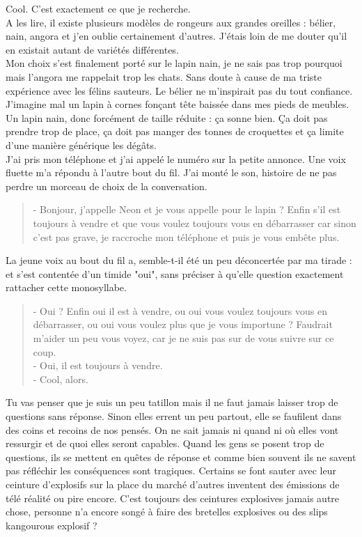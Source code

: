 Cool. C'est exactement ce que je recherche.\\

A les lire, il existe plusieurs modèles de rongeurs aux grandes oreilles : bélier, nain, angora et j'en oublie certainement d'autres. J'étais loin de me douter qu'il en existait autant de variétés différentes.\\
Mon choix s'est finalement porté sur le lapin nain, je ne sais pas trop pourquoi mais l'angora me rappelait trop les chats. Sans doute à cause de ma triste expérience avec les félins sauteurs. Le bélier ne m'inspirait pas du tout confiance. J'imagine mal un lapin à cornes fonçant tête baissée dans mes pieds de meubles. Un lapin nain, donc forcément de taille réduite : ça sonne bien. Ça doit pas prendre trop de place, ça doit pas manger des tonnes de croquettes et ça limite d'une manière générique les dégâts. \\

J'ai pris mon téléphone et j'ai appelé le numéro sur la petite annonce. Une voix fluette m'a répondu à l'autre bout du fil. J'ai monté le son, histoire de ne pas perdre un morceau de choix de la conversation. \\

\begin{quote}
 - Bonjour, j'appelle Neon et je vous appelle pour le lapin ? Enfin s'il est toujours à vendre et que vous voulez toujours vous en débarrasser car sinon c'est pas grave, je raccroche mon téléphone et puis je vous embête plus.
\end{quote}

La jeune voix au bout du fil a, semble-t-il été un peu déconcertée par ma tirade : et s'est contentée d'un timide "oui", sans préciser à qu'elle question exactement rattacher cette monosyllabe. \\

\begin{quote}
- Oui ? Enfin oui il est à vendre, ou oui vous voulez toujours vous en débarrasser, ou oui vous voulez plus que je vous importune ? Faudrait m'aider un peu vous voyez, car je ne suis pas sur de vous suivre sur ce coup. \\
- Oui, il est toujours à vendre. \\
- Cool, alors. \\
\end{quote}

Tu vas penser que je suis un peu tatillon mais il ne faut jamais laisser trop de questions sans réponse. Sinon elles errent un peu partout, elle se faufilent dans des coins et recoins de nos pensés. On ne sait jamais ni quand ni où elles vont ressurgir et de quoi elles seront capables. Quand les gens se posent trop de questions, ils se mettent en quêtes de réponse et comme bien souvent ils ne savent pas réfléchir les conséquences sont tragiques. Certains se font sauter avec leur ceinture d'explosifs sur la place du marché d'autres inventent des émissions de télé réalité ou pire encore. C'est toujours des ceintures explosives jamais autre chose, personne n'a encore songé à faire des bretelles explosives ou des slips kangourous explosif ?\\

